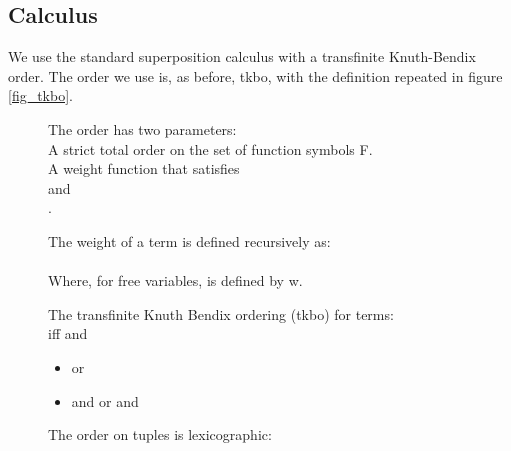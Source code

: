 \subsection*{Calculus}
We use the standard superposition calculus with a transfinite Knuth-Bendix order.
The order we use is, as before, tkbo, with the definition repeated in figure \ref{fig_tkbo}.

\begin{figure}
The order has two parameters:\\
A strict total order \m{\succ} on the set of function symbols F.\\
A weight function  that satisfies \\
 and\\
.

\bigskip

\noindent
The weight of a term is defined recursively as:\\
\\
Where, for free variables,  is defined by w.

\bigskip

\noindent
The transfinite Knuth Bendix ordering (tkbo) for terms:\\
 iff  and
\begin{itemize}
	\item {} or
	\item {} and
		\subitem {} or
		\subitem {} and 
\end{itemize}
The order on tuples is lexicographic:\\

\bigskip


\end{figure}
